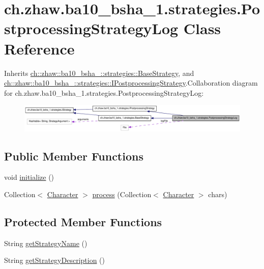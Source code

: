 \hypertarget{classch_1_1zhaw_1_1ba10__bsha__1_1_1strategies_1_1PostprocessingStrategyLog}{
\section{ch.zhaw.ba10\_\-bsha\_\-1.strategies.PostprocessingStrategyLog Class Reference}
\label{classch_1_1zhaw_1_1ba10__bsha__1_1_1strategies_1_1PostprocessingStrategyLog}
}


Inherits \hyperlink{classch_1_1zhaw_1_1ba10__bsha__1_1_1strategies_1_1BaseStrategy}{ch::zhaw::ba10\_\-bsha\_::strategies::BaseStrategy}, and \hyperlink{interfacech_1_1zhaw_1_1ba10__bsha__1_1_1strategies_1_1IPostprocessingStrategy}{ch::zhaw::ba10\_\-bsha\_::strategies::IPostprocessingStrategy}.Collaboration diagram for ch.zhaw.ba10\_\-bsha\_\-1.strategies.PostprocessingStrategyLog:\nopagebreak
\begin{figure}[H]
\begin{center}
\leavevmode
\includegraphics[width=400pt]{classch_1_1zhaw_1_1ba10__bsha__1_1_1strategies_1_1PostprocessingStrategyLog__coll__graph}
\end{center}
\end{figure}
\subsection*{Public Member Functions}
\begin{DoxyCompactItemize}
\item 
void \hyperlink{classch_1_1zhaw_1_1ba10__bsha__1_1_1strategies_1_1PostprocessingStrategyLog_af34bf152422d8a8ebc3540f317764e65}{initialize} ()
\item 
Collection$<$ \hyperlink{classch_1_1zhaw_1_1ba10__bsha__1_1_1Character}{Character} $>$ \hyperlink{classch_1_1zhaw_1_1ba10__bsha__1_1_1strategies_1_1PostprocessingStrategyLog_a284bd1d88fb08a15ec240911d11d23c9}{process} (Collection$<$ \hyperlink{classch_1_1zhaw_1_1ba10__bsha__1_1_1Character}{Character} $>$ chars)
\end{DoxyCompactItemize}
\subsection*{Protected Member Functions}
\begin{DoxyCompactItemize}
\item 
String \hyperlink{classch_1_1zhaw_1_1ba10__bsha__1_1_1strategies_1_1PostprocessingStrategyLog_a8ec219607a862bcff3c4290f020d4575}{getStrategyName} ()
\item 
String \hyperlink{classch_1_1zhaw_1_1ba10__bsha__1_1_1strategies_1_1PostprocessingStrategyLog_a408e3b37b22ae4e501a65ce78afce2a1}{getStrategyDescription} ()
\end{DoxyCompactItemize}
